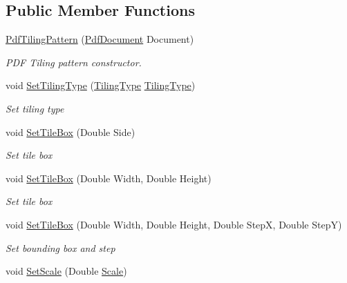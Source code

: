 \subsection*{Public Member Functions}
\begin{DoxyCompactItemize}
\item 
\hyperlink{class_pdf_file_writer_1_1_pdf_tiling_pattern_acd52d10781fc8d238626ea4cc2068830}{Pdf\+Tiling\+Pattern} (\hyperlink{class_pdf_file_writer_1_1_pdf_document}{Pdf\+Document} Document)
\begin{DoxyCompactList}\small\item\em P\+DF Tiling pattern constructor. \end{DoxyCompactList}\item 
void \hyperlink{class_pdf_file_writer_1_1_pdf_tiling_pattern_a5c43e5344264e0e82b571974a32c422f}{Set\+Tiling\+Type} (\hyperlink{namespace_pdf_file_writer_a1318e29d2b6d734592dc70a0f30004da}{Tiling\+Type} \hyperlink{namespace_pdf_file_writer_a1318e29d2b6d734592dc70a0f30004da}{Tiling\+Type})
\begin{DoxyCompactList}\small\item\em Set tiling type \end{DoxyCompactList}\item 
void \hyperlink{class_pdf_file_writer_1_1_pdf_tiling_pattern_a6e9f68d251dd386a23b053c1b3d81f6a}{Set\+Tile\+Box} (Double Side)
\begin{DoxyCompactList}\small\item\em Set tile box \end{DoxyCompactList}\item 
void \hyperlink{class_pdf_file_writer_1_1_pdf_tiling_pattern_aacafdd8222b04ef28d04a4b1d61d3e62}{Set\+Tile\+Box} (Double Width, Double Height)
\begin{DoxyCompactList}\small\item\em Set tile box \end{DoxyCompactList}\item 
void \hyperlink{class_pdf_file_writer_1_1_pdf_tiling_pattern_a6aa50003b3e176453b3467b09446f2f2}{Set\+Tile\+Box} (Double Width, Double Height, Double StepX, Double StepY)
\begin{DoxyCompactList}\small\item\em Set bounding box and step \end{DoxyCompactList}\item 
void \hyperlink{class_pdf_file_writer_1_1_pdf_tiling_pattern_abd8c6af7466f63529418d2e48caae881}{Set\+Scale} (Double \hyperlink{class_pdf_file_writer_1_1_pdf_contents_af2d7cc040971ee1a57c0c5d3fbb888a5}{Scale})

\end{DoxyCompactItemize}
